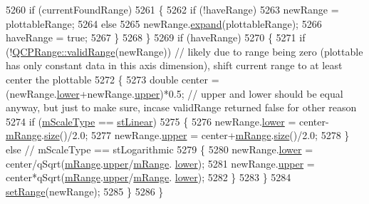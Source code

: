 \begin{DoxyCode}
5260     \textcolor{keywordflow}{if} (currentFoundRange)
5261     \{
5262       \textcolor{keywordflow}{if} (!haveRange)
5263         newRange = plottableRange;
5264       \textcolor{keywordflow}{else}
5265         newRange.\hyperlink{class_q_c_p_range_a0fa1bc8048be50d52bea93a8caf08305}{expand}(plottableRange);
5266       haveRange = \textcolor{keyword}{true};
5267     \}
5268   \}
5269   \textcolor{keywordflow}{if} (haveRange)
5270   \{
5271     \textcolor{keywordflow}{if} (!\hyperlink{class_q_c_p_range_ab38bd4841c77c7bb86c9eea0f142dcc0}{QCPRange::validRange}(newRange)) \textcolor{comment}{// likely due to range being zero (plottable
       has only constant data in this axis dimension), shift current range to at least center the plottable}
5272     \{
5273       \textcolor{keywordtype}{double} center = (newRange.\hyperlink{class_q_c_p_range_aa3aca3edb14f7ca0c85d912647b91745}{lower}+newRange.\hyperlink{class_q_c_p_range_ae44eb3aafe1d0e2ed34b499b6d2e074f}{upper})*0.5; \textcolor{comment}{// upper and lower should be equal
       anyway, but just to make sure, incase validRange returned false for other reason}
5274       \textcolor{keywordflow}{if} (\hyperlink{class_q_c_p_axis_ad706039549cbbbec5fcb2baf7894e04d}{mScaleType} == \hyperlink{class_q_c_p_axis_a36d8e8658dbaa179bf2aeb973db2d6f0aff6e30a11a828bc850caffab0ff994f6}{stLinear})
5275       \{
5276         newRange.\hyperlink{class_q_c_p_range_aa3aca3edb14f7ca0c85d912647b91745}{lower} = center-\hyperlink{class_q_c_p_axis_a1ee36773c49062d751560e11f90845f7}{mRange}.\hyperlink{class_q_c_p_range_afa57c13049b965edb6fd1c00ac56338a}{size}()/2.0;
5277         newRange.\hyperlink{class_q_c_p_range_ae44eb3aafe1d0e2ed34b499b6d2e074f}{upper} = center+\hyperlink{class_q_c_p_axis_a1ee36773c49062d751560e11f90845f7}{mRange}.\hyperlink{class_q_c_p_range_afa57c13049b965edb6fd1c00ac56338a}{size}()/2.0;
5278       \} \textcolor{keywordflow}{else} \textcolor{comment}{// mScaleType == stLogarithmic}
5279       \{
5280         newRange.\hyperlink{class_q_c_p_range_aa3aca3edb14f7ca0c85d912647b91745}{lower} = center/qSqrt(\hyperlink{class_q_c_p_axis_a1ee36773c49062d751560e11f90845f7}{mRange}.\hyperlink{class_q_c_p_range_ae44eb3aafe1d0e2ed34b499b6d2e074f}{upper}/\hyperlink{class_q_c_p_axis_a1ee36773c49062d751560e11f90845f7}{mRange}.
      \hyperlink{class_q_c_p_range_aa3aca3edb14f7ca0c85d912647b91745}{lower});
5281         newRange.\hyperlink{class_q_c_p_range_ae44eb3aafe1d0e2ed34b499b6d2e074f}{upper} = center*qSqrt(\hyperlink{class_q_c_p_axis_a1ee36773c49062d751560e11f90845f7}{mRange}.\hyperlink{class_q_c_p_range_ae44eb3aafe1d0e2ed34b499b6d2e074f}{upper}/\hyperlink{class_q_c_p_axis_a1ee36773c49062d751560e11f90845f7}{mRange}.
      \hyperlink{class_q_c_p_range_aa3aca3edb14f7ca0c85d912647b91745}{lower});
5282       \}
5283     \}
5284     \hyperlink{class_q_c_p_axis_aebdfea5d44c3a0ad2b4700cd4d25b641}{setRange}(newRange);
5285   \}
5286 \}
\end{DoxyCode}


